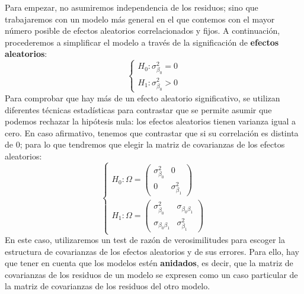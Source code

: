 \documentclass[
  letterpaper,
  DIV=11,
  numbers=noendperiod]{scrreprt}
\begin{document}
Para empezar, no asumiremos independencia de los residuos; sino que
trabajaremos con un modelo más general en el que contemos con el mayor
número posible de efectos aleatorios correlacionados y fijos. A
continuación, procederemos a simplificar el modelo a través de la
significación de \textbf{efectos aleatorios}: \[
\begin{cases} 
H_0 : \sigma^2_{\beta_0} = 0 \\ 
H_1 : \sigma^2_{\beta_0} > 0 
\end{cases}
\] Para comprobar que hay más de un efecto aleatorio significativo, se
utilizan diferentes técnicas estadísticas para contrastar que se permite
asumir que podemos rechazar la hipótesis nula: los efectos aleatorios
tienen varianza igual a cero. En caso afirmativo, tenemos que contrastar
que si su correlación es distinta de 0; para lo que tendremos que elegir
la matriz de covarianzas de los efectos aleatorios: \[
\begin{cases}
H_0 : \Omega = 
\begin{pmatrix}
\sigma^2_{\beta_0} & 0 \\
0 & \sigma^2_{\beta_1}
\end{pmatrix} \\
H_1 : \Omega = 
\begin{pmatrix}
\sigma^2_{\beta_0} & \sigma_{\beta_0 \beta_1} \\
\sigma_{\beta_0 \beta_1} & \sigma^2_{\beta_1}
\end{pmatrix}
\end{cases}
\] En este caso, utilizaremos un test de razón de verosimilitudes para
escoger la estructura de covarianzas de los efectos aleatorios y de sus
errores. Para ello, hay que tener en cuenta que los modelos estén
\textbf{anidados}, es decir, que la matriz de covarianzas de los
residuos de un modelo se expresen como un caso particular de la matriz
de covarianzas de los residuos del otro modelo.
\end{document}
